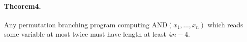 \paragraph{Theorem4.} Any permutation branching program computing $\mathrm{AND}(x_1,\ldots,x_n)$ which reads some variable at most twice must have length at least $4n-4$.
